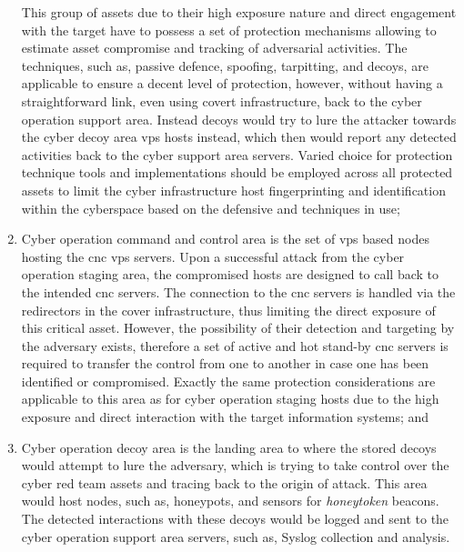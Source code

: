 \begin{enumerate}
    This group of assets due to their high exposure nature and direct engagement with the target have to possess a set of protection mechanisms allowing to estimate asset compromise and tracking of adversarial activities. The techniques, such as, passive defence, spoofing, tarpitting, and decoys, are applicable to ensure a decent level of protection, however, without having a straightforward link, even using covert infrastructure, back to the cyber operation support area. Instead decoys would try to lure the attacker towards the cyber decoy area \gls{vps} hosts instead, which then would report any detected activities back to the cyber support area servers. Varied choice for protection technique tools and implementations should be employed across all protected assets to limit the cyber infrastructure host fingerprinting and identification within the cyberspace based on the defensive and techniques in use;
    \item Cyber operation command and control area is the set of \gls{vps} based nodes hosting the \gls{cnc} \gls{vps} servers. Upon a successful attack from the cyber operation staging area, the compromised hosts are designed to call back to the intended \gls{cnc} servers. The connection to the \gls{cnc} servers is handled via the redirectors in the cover infrastructure, thus limiting the direct exposure of this critical asset. However, the possibility of their detection and targeting by the adversary exists, therefore a set of active and hot stand-by \gls{cnc} servers is required to transfer the control from one to another in case one has been identified or compromised.
    Exactly the same protection considerations are applicable to this area as for cyber operation staging hosts due to the high exposure and direct interaction with the target information systems; and
    \item Cyber operation decoy area is the landing area to where the stored decoys would attempt to lure the adversary, which is trying to take control over the cyber red team assets and tracing back to the origin of attack. This area would host nodes, such as, honeypots, and sensors for \textit{honeytoken} beacons. The detected interactions with these decoys would be logged and sent to the cyber operation support area servers, such as, Syslog collection and analysis.

\end{enumerate}
